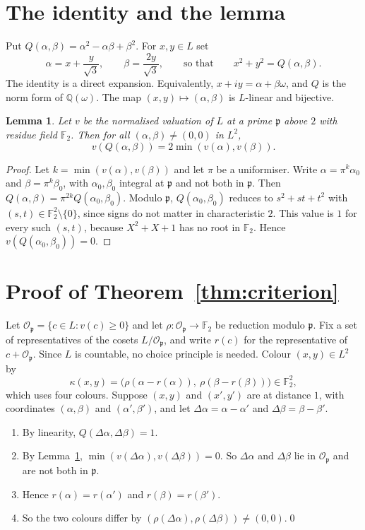 \documentclass[11pt,a4paper]{amsart}
\newtheorem{lemma}[theorem]{Lemma}
\theoremstyle{remark}
\newcommand{\F}{\mathbb{F}}
\newcommand{\Q}{\mathbb{Q}}
\newcommand{\p}{\mathfrak{p}}
\newcommand{\Op}{\mathcal{O}_{\mathfrak{p}}}
\begin{document}
\section{The identity and the lemma}

Put $Q(\alpha,\beta)=\alpha^2-\alpha\beta+\beta^2$. For $x,y\in L$ set
\[
\alpha=x+\frac{y}{\sqrt3},\qquad \beta=\frac{2y}{\sqrt3},\qquad\text{so that}\qquad x^2+y^2=Q(\alpha,\beta).
\]
The identity is a direct expansion. Equivalently, $x+iy=\alpha+\beta\omega$, and $Q$ is the norm form of
$\Q(\omega)$. The map $(x,y)\mapsto(\alpha,\beta)$ is $L$-linear and bijective.

\begin{lemma}\label{lem:valuation}
Let $v$ be the normalised valuation of $L$ at a prime $\p$ above $2$ with residue field $\F_2$. Then for all
$(\alpha,\beta)\ne(0,0)$ in $L^2$,
\[
v(Q(\alpha,\beta))=2\min(v(\alpha),v(\beta)).
\]
\end{lemma}

\begin{proof}
Let $k=\min(v(\alpha),v(\beta))$ and let $\pi$ be a uniformiser. Write $\alpha=\pi^k\alpha_0$ and
$\beta=\pi^k\beta_0$, with $\alpha_0,\beta_0$ integral at $\p$ and not both in $\p$. Then
$Q(\alpha,\beta)=\pi^{2k}Q(\alpha_0,\beta_0)$. Modulo $\p$, $Q(\alpha_0,\beta_0)$ reduces to $s^2+st+t^2$ with
$(s,t)\in\F_2^2\setminus\{0\}$, since signs do not matter in characteristic $2$. This value is $1$ for every
such $(s,t)$, because $X^2+X+1$ has no root in $\F_2$. Hence $v(Q(\alpha_0,\beta_0))=0$.
\end{proof}

\section{Proof of Theorem~\ref{thm:criterion}}

Let $\Op=\{c\in L: v(c)\ge0\}$ and let $\rho\colon\Op\to\F_2$ be reduction modulo $\p$. Fix a set of
representatives of the cosets $L/\Op$, and write $r(c)$ for the representative of $c+\Op$. Since $L$ is
countable, no choice principle is needed. Colour $(x,y)\in L^2$ by
\[
\kappa(x,y)=\bigl(\rho(\alpha-r(\alpha)),\ \rho(\beta-r(\beta))\bigr)\in\F_2^2,
\]
which uses four colours. Suppose $(x,y)$ and $(x',y')$ are at distance $1$, with coordinates $(\alpha,\beta)$
and $(\alpha',\beta')$, and let $\Delta\alpha=\alpha-\alpha'$ and $\Delta\beta=\beta-\beta'$.
\begin{enumerate}
\item By linearity, $Q(\Delta\alpha,\Delta\beta)=1$.
\item By Lemma~\ref{lem:valuation}, $\min(v(\Delta\alpha),v(\Delta\beta))=0$. So $\Delta\alpha$ and
$\Delta\beta$ lie in $\Op$ and are not both in $\p$.
\item Hence $r(\alpha)=r(\alpha')$ and $r(\beta)=r(\beta')$.
\item So the two colours differ by $(\rho(\Delta\alpha),\rho(\Delta\beta))\ne(0,0)$.\qed
\end{enumerate}
\end{document}
